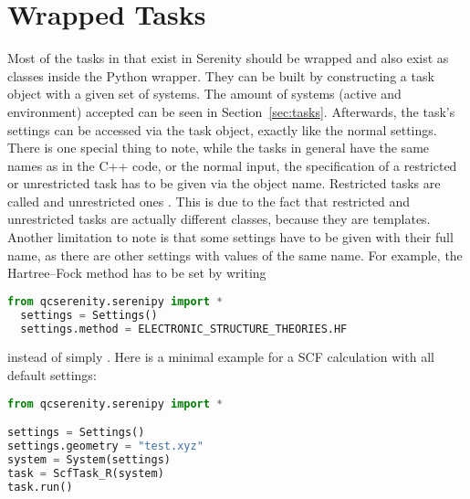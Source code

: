 \section{Wrapped Tasks}
Most of the tasks in that exist in Serenity should be wrapped and also exist as classes inside the Python wrapper.
They can be built by constructing a task object with a given set of systems.
The amount of systems (active and environment) accepted can be seen in Section~\ref{sec:tasks}.
Afterwards, the task's settings can be accessed via the task object, exactly like the normal settings.
There is one special thing to note, while the tasks in general have the same names as in the C++ code, or the
normal input, the specification of a restricted or unrestricted task has to be given via the object name.
Restricted tasks are called  and unrestricted ones .
This is due to the fact that restricted and unrestricted tasks are actually different classes, because they are templates.
Another limitation to note is that some settings have to be given with their full name, as there are other settings with values of the same name. For example, the Hartree--Fock method has to be set by writing
\begin{lstlisting}[language=Python]
  from qcserenity.serenipy import *
  settings = Settings()
  settings.method = ELECTRONIC_STRUCTURE_THEORIES.HF
\end{lstlisting}
instead of simply .
Here is a minimal example for a SCF calculation with all default settings:
\begin{lstlisting}[language=Python]
from qcserenity.serenipy import *

settings = Settings()
settings.geometry = "test.xyz"
system = System(settings)
task = ScfTask_R(system)
task.run()
\end{lstlisting}
